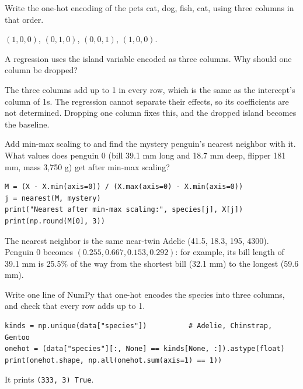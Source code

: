 \begin{Exercise}[label=oh1, title=Encode a variable]
Write the one-hot encoding of the pets cat, dog, fish, cat, using three columns in that order.
\end{Exercise}
\begin{Answer}[ref=oh1]
$(1,0,0)$, $(0,1,0)$, $(0,0,1)$, $(1,0,0)$.
\end{Answer}

\begin{Exercise}[label=oh2, title=Dropping a column]
A regression uses the island variable encoded as three columns. Why should one column be dropped?
\end{Exercise}
\begin{Answer}[ref=oh2]
The three columns add up to 1 in every row, which is the same as the intercept's column of 1s. The regression
cannot separate their effects, so its coefficients are not determined. Dropping one column fixes this, and the
dropped island becomes the baseline.
\end{Answer}

\begin{Exercise}[label=std4, title={Min-max scaling}]
Add min-max scaling to  and find the mystery penguin's nearest neighbor with it. What
values does penguin 0 (bill 39.1 mm long and 18.7 mm deep, flipper 181 mm, mass 3,750 g) get after min-max
scaling?
\end{Exercise}
\begin{Answer}[ref=std4]
\begin{verbatim}
M = (X - X.min(axis=0)) / (X.max(axis=0) - X.min(axis=0))
j = nearest(M, mystery)
print("Nearest after min-max scaling:", species[j], X[j])
print(np.round(M[0], 3))
\end{verbatim}
The nearest neighbor is the same near-twin Adelie (41.5, 18.3, 195, 4300). Penguin 0 becomes
$(0.255, 0.667, 0.153, 0.292)$: for example, its bill length of 39.1 mm is 25.5\% of the way from the shortest
bill (32.1 mm) to the longest (59.6 mm).
\end{Answer}

\begin{Exercise}[label=oh3, title={One-hot species}]
Write one line of NumPy that one-hot encodes the species into three columns, and check that every row adds up
to 1.
\end{Exercise}
\begin{Answer}[ref=oh3]
\begin{verbatim}
kinds = np.unique(data["species"])          # Adelie, Chinstrap, Gentoo
onehot = (data["species"][:, None] == kinds[None, :]).astype(float)
print(onehot.shape, np.all(onehot.sum(axis=1) == 1))
\end{verbatim}
It prints \verb|(333, 3) True|.
\end{Answer}
